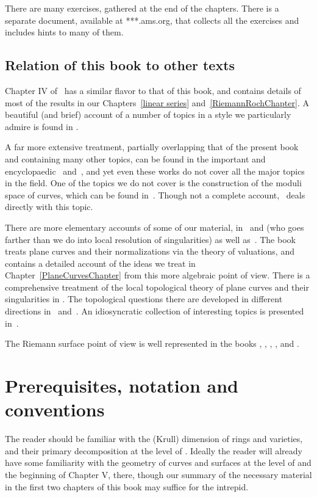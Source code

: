 There are many exercises, gathered at the end of the chapters. There is a separate document, available at ***.ams.org, that
collects all the exercises and includes hints to many of them.

\subsection{Relation of this book to other texts} 
Chapter IV of~\cite{Hartshorne1977} has a similar flavor to that of this book, and contains details of most of the 
results in our Chapters~\ref{linear series} and~\ref{RiemannRochChapter}. A beautiful (and brief) account of a number of topics in a style we particularly admire is found in \cite{MumfordCJ}.

A far more extensive treatment, partially overlapping that of the present book and containing many other topics, can be found in the important and encyclopaedic~\cite{ACGH} and~\cite{ACG}, and yet even these works do not cover all the major topics in the field. 
One of the topics we do not cover is the construction of the moduli space of curves, which can be found
in~\cite{ACG}. Though not a complete account,~\cite{HarrisMorrison1998} deals directly with this
topic. 

There are more elementary accounts of some of our material, in~\cite{Fulton1989} and \cite{Walker1978} (who goes farther than we do into local resolution of singularities) as well as~\cite{Griffiths-curves}. The book~\cite{Kunz} treats plane curves and their normalizations via the theory of valuations, and contains a detailed  account of the ideas we treat in Chapter~\ref{PlaneCurvesChapter} from this more algebraic point of view.  There is a comprehensive treatment of the local topological theory of plane curves and their singularities in \cite{Brieskorn1986}. The topological questions there are developed in different directions in~\cite{MR0239612} %
 and~\cite{MR817982}. %
 An  idiosyncratic collection of interesting topics is presented in~\cite{Clemens-Scrapbook}.

 The Riemann surface point of view is well represented in the books \cite{Forster}, \cite{Gunning}, \cite{Gunning-2}, \cite{Kirwan}, and \cite{Miranda}. 


\section{Prerequisites, notation and conventions}
The reader should be familiar with the (Krull) dimension of rings and varieties, and their primary decomposition at the level of \cite{Atiyah-MacDonald}. Ideally the reader  will already have some familiarity with the geometry of curves and surfaces
at the level of \cite[Chapter IV]{Hartshorne1977} and the beginning of Chapter V, there, though our summary of the necessary material in the first two chapters of this book may suffice for the intrepid.

